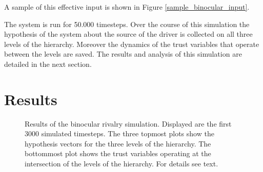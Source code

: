 \documentclass[utf8]{frontiersSCNS} %
\begin{document}
	 A sample of this effective input is shown in Figure \ref{sample_binocular_input}. 
	

   	The system is run for 50.000 timesteps. Over the course of this simulation the hypothesis of the system about the source of the driver is collected on all three levels of the hierarchy. Moreover the dynamics of the trust variables that operate between the levels are saved. The results and analysis of this simulation are detailed in the next section. 


\section{Results}
    \label{sec:results}	
	    \begin{figure}
	    	\centering
	    	     
	
	    	\caption[Results of the binocular rivalry simulation]{Results of the binocular rivalry simulation. Displayed are the first 3000 simulated timesteps. The three topmost plots show the hypothesis vectors for the three levels of the hierarchy. The bottommost plot shows the trust variables operating at the intersection of the levels of the hierarchy. For details see text.}
	     	\label{binocular_result}
	    \end{figure}
	
\end{document}

